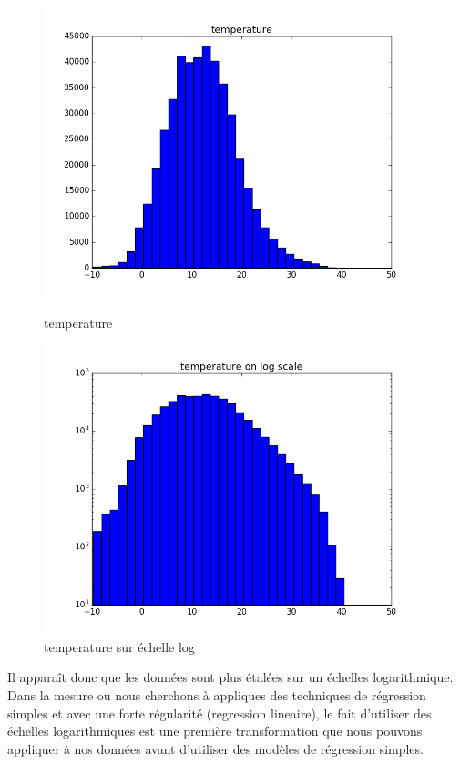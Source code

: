 \begin{figure}[H]
	\captionsetup{labelformat=empty}
	\includegraphics[width=\linewidth]{images/temperature.png}
	\caption{temperature}
	\endminipage\hfill
	\includegraphics[width=\linewidth]{images/log_temperature.png}
	\caption{temperature sur échelle log}
	\endminipage\hfill
\end{figure}

Il apparaît donc que les données sont plus étalées sur un échelles logarithmique.
Dans la mesure ou nous cherchons à appliques des techniques de régression simples %
et avec une forte régularité (regression lineaire), le fait d'utiliser des échelles logarithmiques est une première transformation que nous pouvons appliquer à nos données avant d'utiliser des modèles de régression simples.

